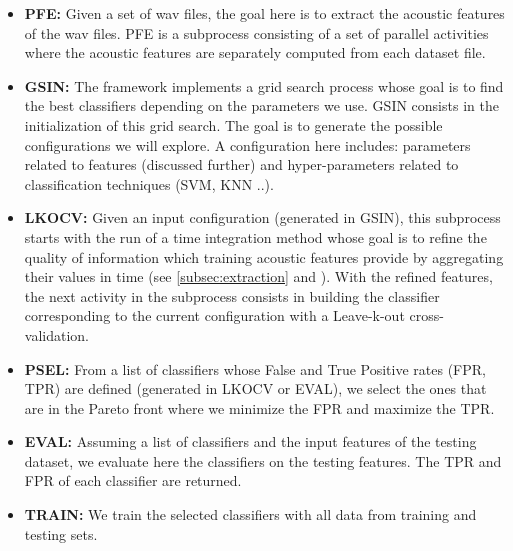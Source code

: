 \documentclass[10pt, conference, compsocconf]{IEEEtran}
\begin{document}
\begin{itemize}

\item {\bf PFE:} Given a set of wav files, the goal here is to extract the acoustic features of the wav files. PFE is a subprocess 
consisting of a set of parallel activities where the acoustic features are separately computed from each dataset file. 

\item {\bf GSIN:} The framework implements a grid search process whose goal is to find the best classifiers depending on the 
parameters we use. GSIN consists in the initialization of this grid search. The goal is to generate the possible configurations 
we will explore. A configuration here includes: parameters related to features (discussed further) and hyper-parameters related to 
classification techniques (SVM, KNN ..).

\item {\bf LKOCV:} Given an input configuration (generated in GSIN), this subprocess starts with the run of a 
  time integration method whose goal is to refine the quality of information which training acoustic features provide by aggregating their values in time (see \ref{subsec:extraction} and \cite{DBLP:journals/taslp/JoderER09}). With the refined features, the next activity 
in the subprocess consists in building the classifier corresponding to the current configuration with a Leave-k-out cross-validation.

\item {\bf PSEL:} From a list of classifiers whose False and True Positive rates (FPR, TPR) are defined (generated in LKOCV or EVAL), we select the ones that are in the Pareto front where we minimize the FPR and maximize the TPR.

\item {\bf EVAL:}  Assuming a list of classifiers and the input features of the testing dataset, we evaluate here the classifiers on the testing features. The TPR and FPR of each classifier are returned.

\item {\bf TRAIN:} We train the selected classifiers with all data from training and testing sets.
\end{itemize}
\end{document}
